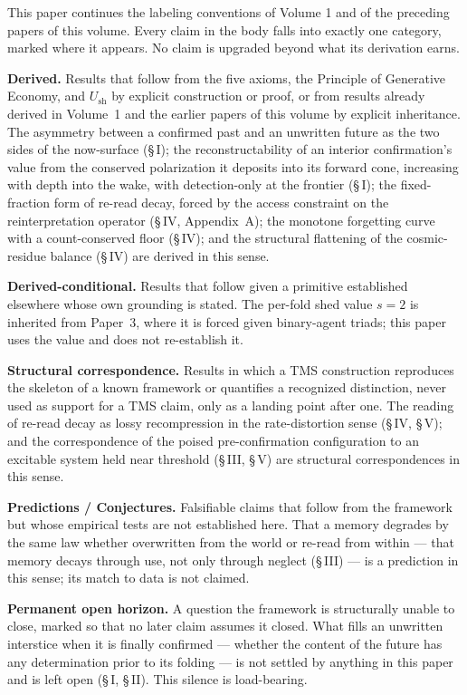 \documentclass[11pt,oneside]{report}
\theoremstyle{definition}
\theoremstyle{remark}
\begin{document}
This paper continues the labeling conventions of Volume 1 and of the
preceding papers of this volume. Every claim in the body falls into
exactly one category, marked where it appears. No claim is upgraded
beyond what its derivation earns.

\textbf{Derived.} Results that follow from the five axioms, the Principle
of Generative Economy, and \ensuremath{U_{\mathrm{sh}}} by explicit
construction or proof, or from results already derived in Volume~1 and
the earlier papers of this volume by explicit inheritance. The
asymmetry between a confirmed past and an unwritten future as the two
sides of the now-surface (\S\,I); the reconstructability of an interior
confirmation's value from the conserved polarization it deposits into its
forward cone, increasing with depth into the wake, with detection-only at
the frontier (\S\,I); the fixed-fraction form of re-read decay, forced by
the access constraint on the reinterpretation operator (\S\,IV,
Appendix~A); the monotone forgetting curve with a count-conserved floor
(\S\,IV); and the structural flattening of the cosmic-residue balance
(\S\,IV) are derived in this sense.

\textbf{Derived-conditional.} Results that follow given a primitive
established elsewhere whose own grounding is stated. The per-fold shed
value \ensuremath{s = 2} is inherited from Paper~3, where it is forced
given binary-agent triads; this paper uses the value and does not
re-establish it.

\textbf{Structural correspondence.} Results in which a TMS construction
reproduces the skeleton of a known framework or quantifies a recognized
distinction, never used as support for a TMS claim, only as a landing
point after one. The reading of re-read decay as lossy recompression in
the rate-distortion sense (\S\,IV, \S\,V); and the correspondence of the
poised pre-confirmation configuration to an excitable system held near
threshold (\S\,III, \S\,V) are structural correspondences in this sense.

\textbf{Predictions / Conjectures.} Falsifiable claims that follow from
the framework but whose empirical tests are not established here. That a
memory degrades by the same law whether overwritten from the world or
re-read from within --- that memory decays through use, not only through
neglect (\S\,III) --- is a prediction in this sense; its match to data is
not claimed.

\textbf{Permanent open horizon.} A question the framework is structurally
unable to close, marked so that no later claim assumes it closed. What
fills an unwritten interstice when it is finally confirmed --- whether the
content of the future has any determination prior to its folding --- is
not settled by anything in this paper and is left open (\S\,I, \S\,II).
This silence is load-bearing.
\end{document}
